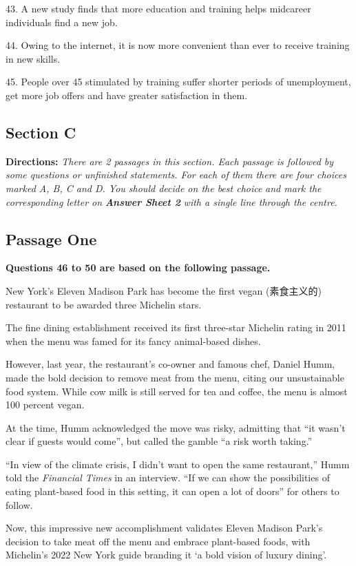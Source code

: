 \documentclass[UTF8,11pt]{ctexart}
\begin{document}
43. A new study finds that more education and training helps midcareer individuals find a new job.


44. Owing to the internet, it is now more convenient than ever to receive training in new skills.


45. People over 45 stimulated by training suffer shorter periods of unemployment, get more job offers and have greater satisfaction in them.


\subsection*{\textbf{Section C}}


\textbf{Directions: }\textit{There are 2 passages in this section. Each passage is followed by some questions or unfinished} \textit{statements. For each of them there are four choices marked A, B, C and D. You should decide on the best choice} \textit{and mark the corresponding letter on }\textbf{\textit{Answer Sheet 2}}\textit{ with a single line through the centre.}


\subsection*{\textbf{Passage One}}


\textbf{Questions 46 to 50 are based on the following passage.}


New York’s Eleven Madison Park has become the first vegan (素食主义的) restaurant to be awarded three Michelin stars.


The fine dining establishment received its first three-star Michelin rating in 2011 when the menu was famed for its fancy animal-based dishes.


However, last year, the restaurant’s co-owner and famous chef, Daniel Humm, made the bold decision to remove meat from the menu, citing our unsustainable food system. While cow milk is still served for tea and coffee, the menu is almost 100 percent vegan.


At the time, Humm acknowledged the move was risky, admitting that “it wasn’t clear if guests would come”, but called the gamble “a risk worth taking.”


“In view of the climate crisis, I didn’t want to open the same restaurant,” Humm told the \textit{Financial Times} in an interview. “If we can show the possibilities of eating plant-based food in this setting, it can open a lot of doors” for others to follow.


Now, this impressive new accomplishment validates Eleven Madison Park’s decision to take meat off the menu and embrace plant-based foods, with Michelin’s 2022 New York guide branding it ‘a bold vision of luxury dining’.
\end{document}
